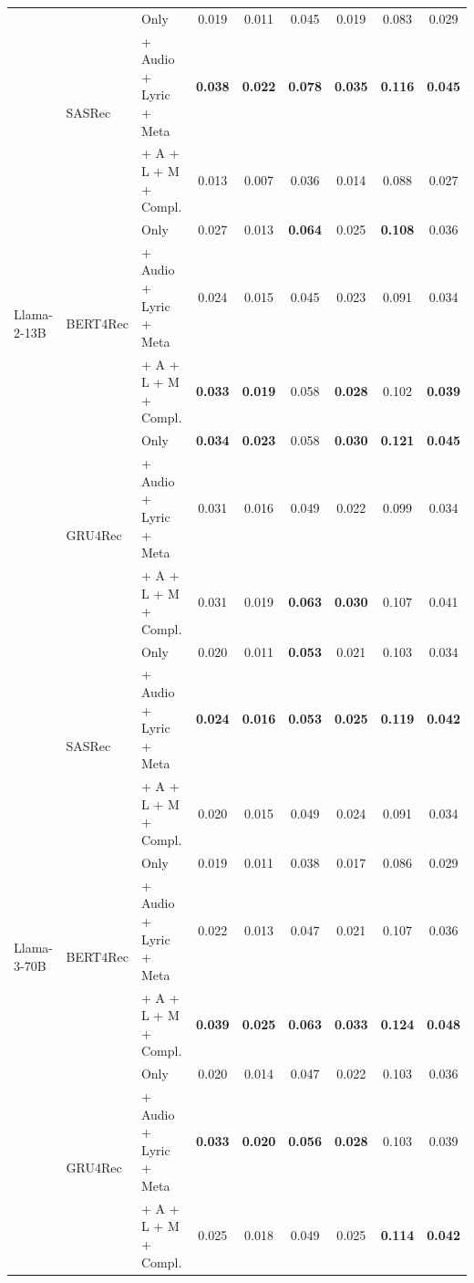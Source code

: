 \begin{table}[t]
\begin{tabular}{lllcccccc}
\multirow{9}{*}{Llama-2-13B}
& \multirow{3}{*}{SASRec}
  & Only                    & 0.019 & 0.011 & 0.045 & 0.019 & 0.083 & 0.029 \\
& & + Audio + Lyric + Meta  & \textbf{0.038} & \textbf{0.022} & \textbf{0.078} & \textbf{0.035} & \textbf{0.116} & \textbf{0.045} \\
& & + A + L + M + Compl.    & 0.013 & 0.007 & 0.036 & 0.014 & 0.088 & 0.027 \\
\cmidrule(lr){2-9}
& \multirow{3}{*}{BERT4Rec}
  & Only                    & 0.027 & 0.013 & \textbf{0.064} & 0.025 & \textbf{0.108} & 0.036 \\
& & + Audio + Lyric + Meta  & 0.024 & 0.015 & 0.045 & 0.023 & 0.091 & 0.034 \\
& & + A + L + M + Compl.    & \textbf{0.033} & \textbf{0.019} & 0.058 & \textbf{0.028} & 0.102 & \textbf{0.039} \\
\cmidrule(lr){2-9}
& \multirow{3}{*}{GRU4Rec}
  & Only                    & \textbf{0.034} & \textbf{0.023} & 0.058 & \textbf{0.030} & \textbf{0.121} & \textbf{0.045} \\
& & + Audio + Lyric + Meta  & 0.031 & 0.016 & 0.049 & 0.022 & 0.099 & 0.034 \\
& & + A + L + M + Compl.    & 0.031 & 0.019 & \textbf{0.063} & \textbf{0.030} & 0.107 & 0.041 \\
\midrule

\multirow{9}{*}{Llama-3-70B}
& \multirow{3}{*}{SASRec}
  & Only                    & 0.020 & 0.011 & \textbf{0.053} & 0.021 & 0.103 & 0.034 \\
& & + Audio + Lyric + Meta  & \textbf{0.024} & \textbf{0.016} & \textbf{0.053} & \textbf{0.025} & \textbf{0.119} & \textbf{0.042} \\
& & + A + L + M + Compl.    & 0.020 & 0.015 & 0.049 & 0.024 & 0.091 & 0.034 \\
\cmidrule(lr){2-9}
& \multirow{3}{*}{BERT4Rec}
  & Only                    & 0.019 & 0.011 & 0.038 & 0.017 & 0.086 & 0.029 \\
& & + Audio + Lyric + Meta  & 0.022 & 0.013 & 0.047 & 0.021 & 0.107 & 0.036 \\
& & + A + L + M + Compl.    & \textbf{0.039} & \textbf{0.025} & \textbf{0.063} & \textbf{0.033} & \textbf{0.124} & \textbf{0.048} \\
\cmidrule(lr){2-9}
& \multirow{3}{*}{GRU4Rec}
  & Only                    & 0.020 & 0.014 & 0.047 & 0.022 & 0.103 & 0.036 \\
& & + Audio + Lyric + Meta  & \textbf{0.033} & \textbf{0.020} & \textbf{0.056} & \textbf{0.028} & 0.103 & 0.039 \\
& & + A + L + M + Compl.    & 0.025 & 0.018 & 0.049 & 0.025 & \textbf{0.114} & \textbf{0.042} \\
\bottomrule
\end{tabular}
\end{table}
